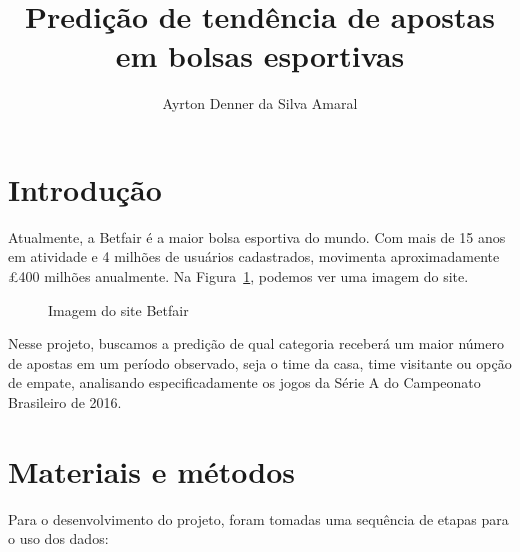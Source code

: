 \documentclass[thesis]{hmcposter}
\author{Ayrton Denner da Silva Amaral}
\title{Predição de tendência de apostas em bolsas esportivas}
\begin{document}
\begin{poster}

\section{Introdução}

Atualmente, a Betfair é a maior bolsa esportiva do mundo.
Com mais de 15 anos em atividade e 4 milhões de usuários cadastrados, movimenta aproximadamente £400 milhões anualmente. Na Figura~\ref{fig:betfair-print}, podemos ver uma imagem do site.

\begin{figure}
\begin{center}
\caption{Imagem do site Betfair}%
\label{fig:betfair-print}
\end{center}
\end{figure}

Nesse projeto, buscamos a predição de qual categoria receberá um maior número de apostas em um período observado, seja o time da casa, time visitante ou opção de empate, analisando especificadamente os jogos da Série A do Campeonato Brasileiro de 2016.

\section{Materiais e métodos}%

Para o desenvolvimento do projeto, foram tomadas uma sequência de etapas para o uso dos dados:


\end{poster}
\end{document}
